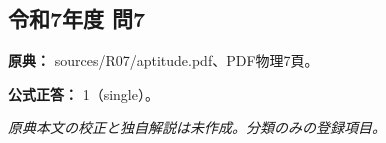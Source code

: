 \subsection{令和7年度 問7}
\label{q:r07-reg-apt-07}

\noindent\textbf{原典：} sources/R07/aptitude.pdf、PDF物理7頁。

\textbf{公式正答：} 1（single）。

\par\textit{原典本文の校正と独自解説は未作成。分類のみの登録項目。}
